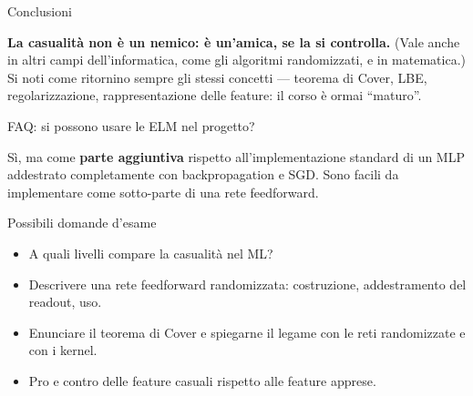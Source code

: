 \begin{boxabstract}{Conclusioni}

\textbf{La casualità non è un nemico: è un'amica, se la si controlla.}
(Vale anche in altri campi dell'informatica, come gli algoritmi
randomizzati, e in matematica.) Si noti come ritornino sempre gli stessi
concetti --- teorema di Cover, LBE, regolarizzazione, rappresentazione
delle feature: il corso è ormai ``maturo''.

\end{boxabstract}

\begin{boxnote}{FAQ: si possono usare le ELM nel progetto?}

Sì, ma come \textbf{parte aggiuntiva} rispetto all'implementazione
standard di un MLP addestrato completamente con backpropagation e SGD.
Sono facili da implementare come sotto-parte di una rete feedforward.

\end{boxnote}

\begin{boxquestion}{Possibili domande d'esame}

\begin{itemize}
\tightlist
\item
  A quali livelli compare la casualità nel ML?
\item
  Descrivere una rete feedforward randomizzata: costruzione,
  addestramento del readout, uso.
\item
  Enunciare il teorema di Cover e spiegarne il legame con le reti
  randomizzate e con i kernel.
\item
  Pro e contro delle feature casuali rispetto alle feature apprese.
\end{itemize}

\end{boxquestion}
